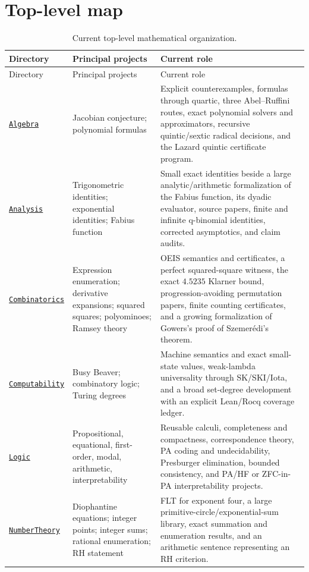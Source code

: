\documentclass[
  10pt,
  a4paper,
  twoside,
  open=any,
  parskip=half,
  headings=big
]{scrreprt}
\newcommand{\CommitFull}{56a402bf82a9aab119fcbe3e96b991d387b221c5}
\newcommand{\RepoWeb}{https://github.com/VladimirReshetnikov/ProveIt}
\newcommand{\RepoTreeBase}{\RepoWeb/tree/\CommitFull}
\newcommand{\RepoDir}[1]{\href{\RepoTreeBase/#1}{\nolinkurl{#1}}}
\begin{document}
\section{Top-level map}

\begin{longtable}{@{}L{31mm}L{45mm}L{79mm}@{}}
\caption{Current top-level mathematical organization.}\label{tab:top-level-map}\\
\toprule
Directory & Principal projects & Current role \\
\midrule
\endfirsthead
\toprule
Directory & Principal projects & Current role \\
\midrule
\endhead
\bottomrule
\endfoot
\RepoDir{Algebra} & Jacobian conjecture; polynomial formulas & Explicit counterexamples, formulas through quartic, three Abel--Ruffini routes, exact polynomial solvers and approximators, recursive quintic/sextic radical decisions, and the Lazard quintic certificate program. \\
\RepoDir{Analysis} & Trigonometric identities; exponential identities; Fabius function & Small exact identities beside a large analytic/arithmetic formalization of the Fabius function, its dyadic evaluator, source papers, finite and infinite q-binomial identities, corrected asymptotics, and claim audits. \\
\RepoDir{Combinatorics} & Expression enumeration; derivative expansions; squared squares; polyominoes; Ramsey theory & OEIS semantics and certificates, a perfect squared-square witness, the exact \(4.5235\) Klarner bound, progression-avoiding permutation papers, finite counting certificates, and a growing formalization of Gowers's proof of Szemer\'edi's theorem. \\
\RepoDir{Computability} & Busy Beaver; combinatory logic; Turing degrees & Machine semantics and exact small-state values, weak-lambda universality through SK/SKI/Iota, and a broad set-degree development with an explicit Lean/Rocq coverage ledger. \\
\RepoDir{Logic} & Propositional, equational, first-order, modal, arithmetic, interpretability & Reusable calculi, completeness and compactness, correspondence theory, PA coding and undecidability, Presburger elimination, bounded consistency, and PA/HF or ZFC-in-PA interpretability projects. \\
\RepoDir{NumberTheory} & Diophantine equations; integer points; integer sums; rational enumeration; RH statement & FLT for exponent four, a large primitive-circle/exponential-sum library, exact summation and enumeration results, and an arithmetic sentence representing an RH criterion. \\

\end{longtable}
\end{document}
